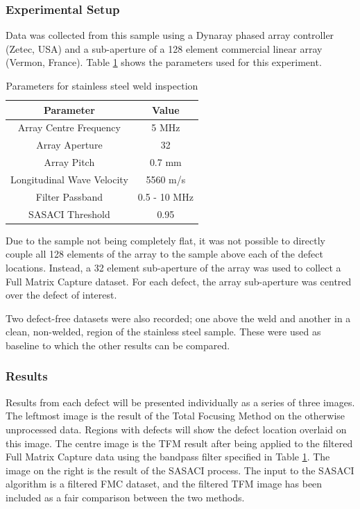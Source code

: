 \subsubsection{Experimental Setup}

Data was collected from this sample using a Dynaray phased array controller (Zetec, USA) and a sub-aperture of a 128 element commercial linear array (Vermon, France). Table \ref{table:amec_setup} shows the parameters used for this experiment.

\begin{table}[htbp!]
\begin{center}
	\begin{tabular}{| c | c |}
	\hline 
	\textbf{Parameter} & \textbf{Value} \\ \hline \hline 
	Array Centre Frequency	& 5 MHz \\ \hline
	Array Aperture & 32 \\ \hline
	Array Pitch & 0.7 mm \\ \hline
	Longitudinal Wave Velocity & 5560 m/s \\ \hline
 	Filter Passband & 0.5 - 10 MHz\\ \hline
	SASACI Threshold & 0.95\\ \hline	
	\end{tabular}
	\caption{Parameters for stainless steel weld inspection}
	\label{table:amec_setup}
	\end{center}
	\end{table}

Due to the sample not being completely flat, it was not possible to directly couple all 128 elements of the array to the sample above each of the defect locations. Instead, a 32 element sub-aperture of the array was used to collect a Full Matrix Capture dataset. For each defect, the array sub-aperture was centred over the defect of interest.

Two defect-free datasets were also recorded; one above the weld and another in a clean, non-welded, region of the stainless steel sample. These were used as baseline to which the other results can be compared.

\subsubsection{Results}

Results from each defect will be presented individually as a series of three images. The leftmost image is the result of the Total Focusing Method on the otherwise unprocessed data. Regions with defects will show the defect location overlaid on this image. The centre image is the TFM result after being applied to the filtered Full Matrix Capture data using the bandpass filter specified in Table \ref{table:amec_setup}. The image on the right is the result of the SASACI process. The input to the SASACI algorithm is a filtered FMC dataset, and the filtered TFM image has been included as a fair comparison between the two methods.

